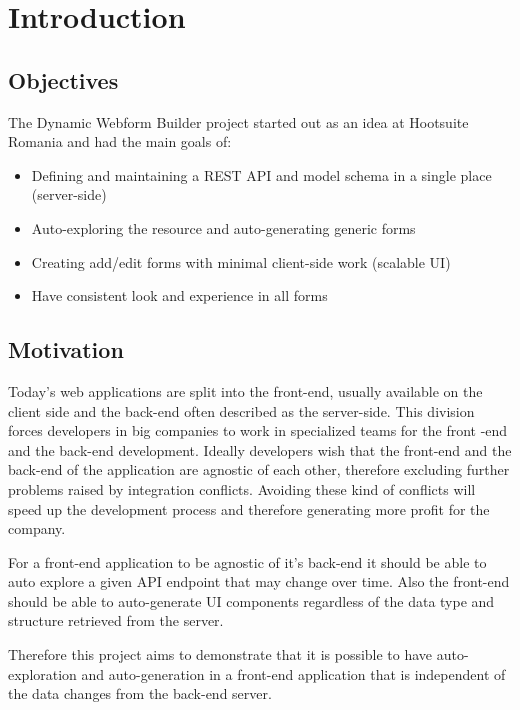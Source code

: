 \chapter{Introduction}
\label{chapter:intro}

\section{Objectives}
\label{sec:objectives}

The Dynamic Webform Builder project started out as an idea at Hootsuite Romania and had the main goals of:
\begin{itemize}

\item Defining and maintaining a REST API and model schema in a single place (server-side)

\item Auto-exploring the resource and auto-generating generic forms

\item Creating add/edit forms with minimal client-side work (scalable UI)

\item Have consistent look and experience in all forms

\end{itemize}

\section{Motivation}
\label{sec:motivation}

Today's web applications are split into the front-end, usually available on the client side and the back-end often described as the server-side. This division forces developers in big companies to work in specialized teams for the front -end and the back-end development. Ideally developers wish that the front-end and the back-end of the application are agnostic of each other, therefore excluding further problems raised by integration conflicts. Avoiding these kind of conflicts will speed up the development process and therefore generating more profit for the company.

For a front-end application to be agnostic of it's back-end it should be able to auto explore a given API endpoint that may change over time. Also the front-end should be able to auto-generate UI components regardless of the data type and structure retrieved from the server.

Therefore this project aims to demonstrate that it is possible to have auto-exploration and auto-generation in a front-end application that is independent of the data changes from the back-end server.


